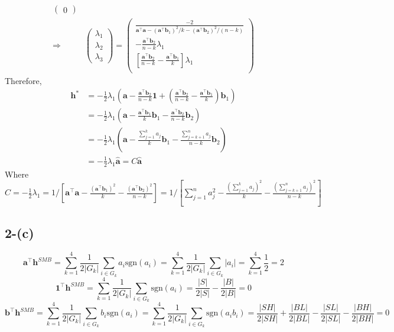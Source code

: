 \documentclass[11pt]{article}
\begin{document}
\begin{equation}
\begin{split}
\begin{pmatrix}
    0
   \end{pmatrix}\\
   \Rightarrow \quad & \begin{pmatrix}
     \lambda_1 \\
     \lambda_2 \\
     \lambda_3
   \end{pmatrix} = \begin{pmatrix}
     \frac{-2}{\bm{a}^{\top} \bm{a} - (\bm{a}^{\top} \bm{b}_1)^2/k-(\bm{a}^{\top} \bm{b}_2)^2/(n-k)} \\[3pt]
     -\frac{\bm{a}^{\top} \bm{b}_2}{n-k} \lambda_1\\[3pt]
     \left[\frac{\bm{a}^{\top} \bm{b}_2}{n-k} - \frac{\bm{a}^{\top} \bm{b}_1}{k}\right] \lambda_1\\[3pt]
   \end{pmatrix}
  \end{split}
\end{equation}
Therefore, 
\begin{equation}
  \begin{split}
    \bm{h}^* &= -\frac{1}{2}\lambda_1 \left(\bm{a} -\frac{\bm{a}^{\top} \bm{b}_2}{n-k}\bm{1} + \left(\frac{\bm{a}^{\top} \bm{b}_2}{n-k} - \frac{\bm{a}^{\top} \bm{b}_1}{k}\right) \bm{b}_1\right) \\
    &=-\frac{1}{2}\lambda_1 \left(\bm{a}  - \frac{\bm{a}^{\top} \bm{b}_1}{k} \bm{b}_1  -\frac{\bm{a}^{\top} \bm{b}_2}{n-k}\bm{b}_2\right) \\
    &=-\frac{1}{2}\lambda_1 \left(\bm{a}  - \frac{\sum_{j=1}^k a_j}{k} \bm{b}_1  -\frac{\sum_{j=k+1}^n a_j}{n-k}\bm{b}_2\right) \\
    &= -\frac{1}{2}\lambda_1 \widehat{\bm{a}} = C \widehat{\bm{a}}
  \end{split}
\end{equation}
Where $C = -\frac{1}{2}\lambda_1 = 1\Big/\left[\bm{a}^{\top} \bm{a} - \frac{(\bm{a}^{\top} \bm{b}_1)^2}{k}-\frac{(\bm{a}^{\top} \bm{b}_2)^2}{n-k}\right]=1\Big/\left[\sum_{j=1}^n a_j^2 - \frac{(\sum_{j=1}^k a_j)^2}{k}-\frac{(\sum_{j=k+1}^n a_j)^2}{n-k}\right]$

 \subsection*{2-(c)}
\begin{equation}
  \bm{a}^{\top} \bm{h}^{SMB} = \sum_{k=1}^4\frac{1}{2|G_k|}\sum_{i\in G_k}a_i \text{sgn}(a_i)  = \sum_{k=1}^4\frac{1}{2|G_k|}\sum_{i\in G_k}|a_i|  = \sum_{k=1}^4 \frac{1}{2} = 2
\end{equation}
\begin{equation}
  \bm{1}^{\top} \bm{h}^{SMB} = \sum_{k=1}^4\frac{1}{2|G_k|}\sum_{i\in G_k} \text{sgn}(a_i)  = \frac{|S|}{2|S|} - \frac{|B|}{2|B|} = 0
\end{equation}
\begin{equation}
  \bm{b}^{\top} \bm{h}^{SMB} = \sum_{k=1}^4\frac{1}{2|G_k|}\sum_{i\in G_k}b_i \text{sgn}(a_i)= \sum_{k=1}^4\frac{1}{2|G_k|}\sum_{i\in G_k} \text{sgn}(a_ib_i) = \frac{|SH|}{2|SH|} + \frac{|BL|}{2|BL|} - \frac{|SL|}{2|SL|} - \frac{|BH|}{2|BH|} = 0
\end{equation}
\end{document}

